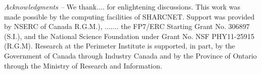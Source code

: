 \documentclass[a4paper,aps,prl,reprint,superscriptaddress,twocolumn,floatfix]{revtex4-1}
\begin{document}
{\em Acknowledgments --} We thank.... for enlightening discussions. 
 This work was made possible by the computing facilities of SHARCNET. Support was provided 
by NSERC of Canada R.G.M.), ....... the FP7/ERC Starting Grant No. 306897 (S.I.), 
and the National Science Foundation under Grant No. NSF PHY11-25915 (R.G.M).
Research at the Perimeter Institute is supported, in
part, by the Government of Canada through Industry Canada
and by the Province of Ontario through the Ministry of
Research and Information.


\end{document}
